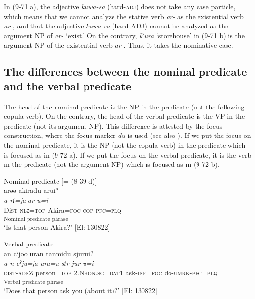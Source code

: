 In (9-71 a), the adjective \textit{kuwa-sa} (hard-\textsc{adj}) does not take any case particle, which means that we cannot analyze the stative verb \textit{ar-} as the existential verb \textit{ar-}, and that the adjective \textit{kuwa-sa} (hard-ADJ) cannot be analyzed as the argument NP of \textit{ar-} ‘exist.’ On the contrary, \textit{kˀura} ‘storehouse’ in (9-71 b) is the argument NP of the existential verb \textit{ar-}. Thus, it takes the nominative case.

\subsection{The differences between the nominal predicate and the verbal predicate}\label{sec:9.4.3}

The head of the nominal predicate is the NP in the predicate (not the following copula verb). On the contrary, the head of the verbal predicate is the VP in the predicate (not its argument NP). This difference is attested by the focus construction, where the focus marker \textit{du} is used (see also ). If we put the focus on the nominal predicate, it is the NP (not the copula verb) in the predicate which is focused as in (9-72 a). If we put the focus on the verbal predicate, it is the verb in the predicate (not the argument NP) which is focused as in (9-72 b).

\ea   \label{ex:9.72}
\ea Nominal predicate [= (8-39 d)]\\
 \gllll  arəə  akiradu  arui?\\
    \textit{a-rɨ=ja}  \textit{}  \textit{ar-u=i}\\
    Di\textsc{st}-\textsc{nlz}=\textsc{top}  Akira=\textsc{foc}  \textsc{cop}-\textsc{pfc}=\textsc{plq}\\
      [NP  Copula verb]\textsubscript{Nominal predicate phrase}\\
    \glt     ‘Is that person Akira?’ [El: 130822]

\ex Verbal predicate\\
 \gllll  an  cˀjoo  uran  tanmidu  sjurui?\\
    \textit{a-n}  \textit{cˀju=ja}  \textit{ura=n}  \textit{}  \textit{sɨr-jur-u=i}\\
    \textsc{dist}{}-\textsc{adn}Z  person=\textsc{top}  2.N\textsc{hon}.\textsc{sg}=\textsc{dat}1  ask-\textsc{inf}=\textsc{foc}  do-\textsc{umrk}{}-\textsc{pfc}=\textsc{plq}\\
      [Complement  VP]\textsubscript{Verbal predicate phrase}\\
    \glt     ‘Does that person ask you (about it)?’ [El: 130822]
    \z
\z

